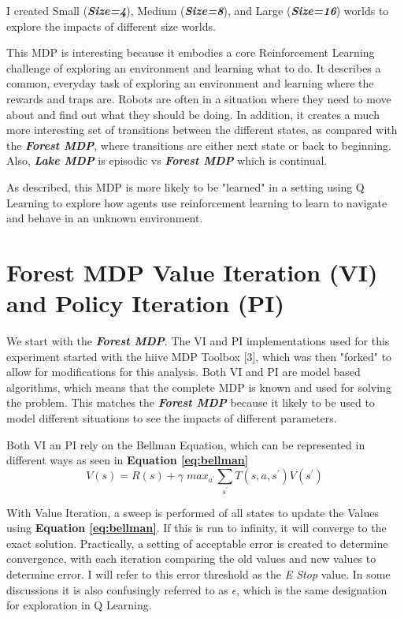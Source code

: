 \documentclass[letterpaper]{article} %
\begin{document}
I created Small (\textbf{\emph{Size=4}}), Medium (\textbf{\emph{Size=8}}), and Large (\textbf{\emph{Size=16}}) worlds to explore the impacts of different size worlds.  

This MDP is interesting because it embodies a core Reinforcement Learning challenge of exploring an environment and learning what to do.  It describes a common, everyday task of exploring an environment and learning where the rewards and traps are.  Robots are often in a situation where they need to move about and find out what they should be doing.  In addition, it creates a much more interesting set of transitions between the different states, as compared with the \textbf{\emph{Forest MDP}}, where transitions are either next state or back to beginning.  Also, \textbf{\emph{Lake MDP}} is episodic vs  \textbf{\emph{Forest MDP}} which is continual.

As described, this MDP is more likely to be "learned" in a setting using Q Learning to explore how agents use reinforcement learning to learn to navigate and behave in an unknown environment.

\section{Forest MDP Value Iteration (VI) and Policy Iteration (PI)}
We start with the \textbf{\emph{Forest MDP}}.   The VI and PI implementations used for this experiment started with the hiive MDP Toolbox [3], which was then "forked" to allow for modifications for this analysis.  Both VI and PI are model based algorithms, which means that the complete MDP is known and used for solving the problem.  This matches the \textbf{\emph{Forest MDP}} because it likely to be used to model different situations to see the impacts of different parameters.   

Both VI an PI rely on the Bellman Equation, which can be represented in different ways as seen in  \textbf{Equation \ref{eq:bellman}} 
\begin{equation} 
\label{eq:bellman}
V(s) = R(s) + \gamma \; max_{a^\prime}  \sum_{s^\prime} T(s,a,s^\prime) V(s^\prime)
\end{equation}

With Value Iteration, a sweep is performed of all states to update the Values using \textbf{Equation \ref{eq:bellman}}.  If this is run to infinity, it will converge to the exact solution.  Practically, a setting of acceptable error is created to determine convergence, with each iteration comparing the old values and new values to determine error.  I will refer to this error threshold as the \emph{E Stop} value.  In some discussions it is also confusingly referred to as $\epsilon$,  which is the same designation for exploration in Q Learning. 
\end{document}
